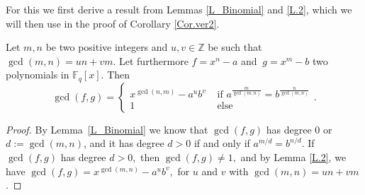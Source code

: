\documentclass[12pt]{elsarticle}
\newcommand{\Fq}{\mathbb{F}_{q}}
\theoremstyle{break}
{\theorembodyfont{\upshape}
    \newtheorem{theorem}{Theorem}[section] %
    \newtheorem{lemma}[theorem]{Lemma} %
    \newtheorem{proposition}[theorem]{Proposition}
    \newtheorem{corollary}[theorem]{Corollary}
    \newtheorem{definition}[theorem]{Definition}
    \newtheorem{example}[theorem]{Example}
    \newtheorem{remark}[theorem]{Remark}
    \newtheorem{conjecture}[theorem]{Conjecture}
    \newtheorem*{proof}{{Proof}}
	\newtheorem*{notation}{Notation}
	\newtheorem*{main}{Cain Theorem}
	\newtheorem*{problem}{Problem}
}
\begin{document}


For this we first derive a result from Lemmas \ref{L_Binomial} and \ref{L.2}, which we will then use in the proof of Corollary \ref{Cor.ver2}.

\begin{lemma}\label{Cor_Binomial}
Let $m,n$ be two positive integers and $u,v \in \mathbb Z$ be such that $\gcd(m, n)= un+vm$. Let furthermore $f=x^n-a$ and $\ g=x^m-b$ two polynomials in $\Fq[x]$. 
Then  $$ \gcd(f, g) =
\begin{cases}
x^{\gcd(n,m)} - a^{u}b^{v}  & \text{ if }  a^{ \frac{m}{\gcd(m, n)}}=b^{\frac{n}{\gcd(m, n)}} \\
1 & \text{ else }
\end{cases} .$$ 
\end{lemma}

\begin{proof}

By Lemma~\ref{L_Binomial} we know that $\gcd(f,g)$ has degree $0$ or $d := \gcd(m,n)$, and it has degree $d>0$ if and only if $a^{m/d} =b^{n/d}$.  
If $\gcd(f,g)$ has degree $d> 0,$ then  $\gcd(f,g)\neq 1,$ and by Lemma \ref{L.2},  we have   $ \gcd(f, g) = x^{\gcd(m,n)} -  a^u b^v ,$  for $ u $ and $ v $ with $ \gcd(m, n) = u n + v m $.

\end{proof}
\end{document}

